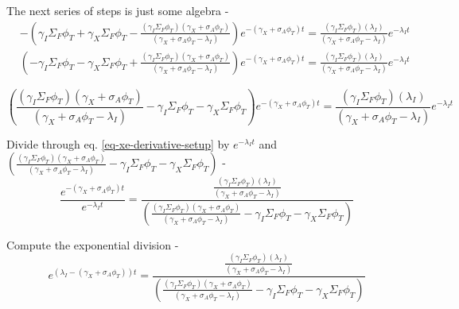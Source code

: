 \documentclass[11pt,a4paper]{article}
\begin{document}
\noindent The next series of steps is just some algebra - 
\begin{equation}
    \begin{split}
        & -(\gamma_I\Sigma_F\phi_T+\gamma_X\Sigma_F\phi_T-\frac{(\gamma_I\Sigma_F\phi_T)(\gamma_X+\sigma_A\phi_T)}{(\gamma_X+\sigma_A\phi_T-\lambda_I)})e^{-(\gamma_X+\sigma_A\phi_T)t}=\frac{(\gamma_I\Sigma_F\phi_T)(\lambda_I)}{(\gamma_X+\sigma_A\phi_T-\lambda_I)}e^{-\lambda_I t} \\
        & (-\gamma_I\Sigma_F\phi_T-\gamma_X\Sigma_F\phi_T+\frac{(\gamma_I\Sigma_F\phi_T)(\gamma_X+\sigma_A\phi_T)}{(\gamma_X+\sigma_A\phi_T-\lambda_I)})e^{-(\gamma_X+\sigma_A\phi_T)t}=\frac{(\gamma_I\Sigma_F\phi_T)(\lambda_I)}{(\gamma_X+\sigma_A\phi_T-\lambda_I)}e^{-\lambda_I t}
    \end{split}
\end{equation}
\vspace{\baselineskip}

\begin{equation} \label{eq-xe-derivative-setup}
        (\frac{(\gamma_I\Sigma_F\phi_T)(\gamma_X+\sigma_A\phi_T)}{(\gamma_X+\sigma_A\phi_T-\lambda_I)}-\gamma_I\Sigma_F\phi_T-\gamma_X\Sigma_F\phi_T)e^{-(\gamma_X+\sigma_A\phi_T)t}=\frac{(\gamma_I\Sigma_F\phi_T)(\lambda_I)}{(\gamma_X+\sigma_A\phi_T-\lambda_I)}e^{-\lambda_I t}
\end{equation}
\vspace{\baselineskip}

\noindent Divide through eq. \ref{eq-xe-derivative-setup} by $e^{-\lambda_I t}$ and $(\frac{(\gamma_I\Sigma_F\phi_T)(\gamma_X+\sigma_A\phi_T)}{(\gamma_X+\sigma_A\phi_T-\lambda_I)}-\gamma_I\Sigma_F\phi_T-\gamma_X\Sigma_F\phi_T)$ -
\begin{equation} 
    \frac{e^{-(\gamma_X+\sigma_A\phi_T)t}}{e^{-\lambda_I t}}=\frac{\frac{(\gamma_I\Sigma_F\phi_T)(\lambda_I)}{(\gamma_X+\sigma_A\phi_T-\lambda_I)}}{(\frac{(\gamma_I\Sigma_F\phi_T)(\gamma_X+\sigma_A\phi_T)}{(\gamma_X+\sigma_A\phi_T-\lambda_I)}-\gamma_I\Sigma_F\phi_T-\gamma_X\Sigma_F\phi_T)}
\end{equation}
\vspace{\baselineskip}

\noindent Compute the exponential division - 
\begin{equation}
    e^{(\lambda_I-(\gamma_X+\sigma_A\phi_T))t}=\frac{\frac{(\gamma_I\Sigma_F\phi_T)(\lambda_I)}{(\gamma_X+\sigma_A\phi_T-\lambda_I)}}{(\frac{(\gamma_I\Sigma_F\phi_T)(\gamma_X+\sigma_A\phi_T)}{(\gamma_X+\sigma_A\phi_T-\lambda_I)}-\gamma_I\Sigma_F\phi_T-\gamma_X\Sigma_F\phi_T)}
\end{equation}
\vspace{\baselineskip}
\end{document}
